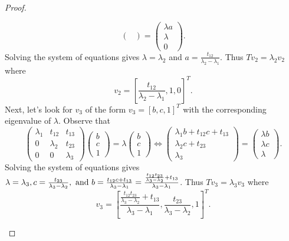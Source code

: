 \documentclass[12pt]{report}
\begin{document}
\begin{problem}
\begin{proof}
\begin{enumerate}
\[\begin{pmatrix}
          \end{pmatrix}  = \begin{pmatrix}
               \lambda a \\ \lambda \\ 0
          \end{pmatrix}.
     \]
     Solving the system of equations gives $\lambda = \lambda_2$ and $a = \frac{t_{12}}{\lambda_2 - \lambda_1}$. Thus $Tv_2 = \lambda_2 v_2$ where 
     \[
           v_2 = \left[\frac{t_{12}}{\lambda_2 - \lambda_1},1,0\right]^T.
     \]
     Next, let's look for $v_3$ of the form $v_3 = [b,c,1]^T$ with the corresponding eigenvalue of $\lambda$. Observe that
     \[
          \begin{pmatrix}
               \lambda_1 & t_{12} & t_{13}\\ 0 & \lambda_2 & t_{23}\\ 0 & 0 & \lambda_3
          \end{pmatrix}\begin{pmatrix}
               b \\ c \\ 1
          \end{pmatrix} = \lambda \begin{pmatrix}
               b \\ c \\ 1
          \end{pmatrix} \iff \begin{pmatrix}
               \lambda_1 b + t_{12}c + t_{13} \\ \lambda_2 c + t_{23}\\
               \lambda_3
          \end{pmatrix}  = \begin{pmatrix}
               \lambda b \\ \lambda c\\ \lambda
          \end{pmatrix}.
     \]
     Solving the system of equations gives $\lambda = \lambda_3, c = \frac{t_{23}}{\lambda_3 - \lambda_2}, {~\text{and}~} b = \frac{t_{12}c + t_{13}}{\lambda_3 - \lambda_1} = \frac{\frac{t_{12}t_{23}}{\lambda_3 - \lambda_2} + t_{13}}{\lambda_3 - \lambda_1}$. Thus $Tv_3 = \lambda_3 v_3$ where 
     \[
           v_3 = \left[\frac{\frac{t_{12}t_{23}}{\lambda_3 - \lambda_2} + t_{13}}{\lambda_3 - \lambda_1}, \frac{t_{23}}{\lambda_3 - \lambda_2}, 1\right]^T.
     \]
     



\end{enumerate}
\end{proof}
\end{problem}
\end{document}
